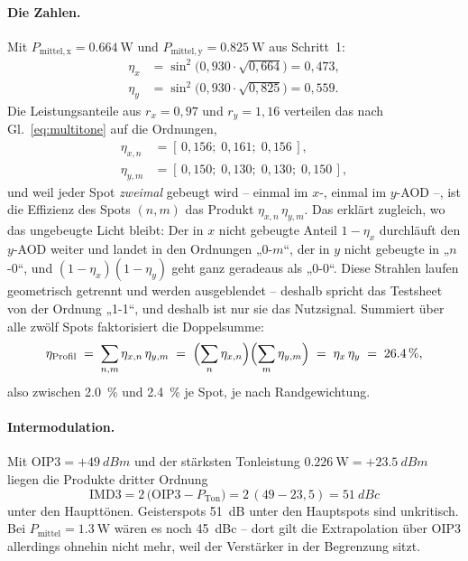 \documentclass[11pt,a4paper]{article}
\begin{document}
\paragraph{Die Zahlen.}
Mit $P_\mathrm{mittel,x}=\SI{0.664}{\watt}$ und
$P_\mathrm{mittel,y}=\SI{0.825}{\watt}$ aus Schritt~1:
\begin{align}
  \eta_x &= \sin^2\!\bigl(0{,}930\cdot\sqrt{0{,}664}\bigr) = 0{,}473 ,\\
  \eta_y &= \sin^2\!\bigl(0{,}930\cdot\sqrt{0{,}825}\bigr) = 0{,}559 .
\end{align}
Die Leistungsanteile aus $r_x=0{,}97$ und $r_y=1{,}16$ verteilen das nach
Gl.~\eqref{eq:multitone} auf die Ordnungen,
\begin{align}
  \eta_{x,n} &= [\,0{,}156;\;0{,}161;\;0{,}156\,], \\
  \eta_{y,m} &= [\,0{,}150;\;0{,}130;\;0{,}130;\;0{,}150\,],
\end{align}
und weil jeder Spot \emph{zweimal} gebeugt wird -- einmal im $x$-, einmal im
$y$-AOD --, ist die Effizienz des Spots $(n,m)$ das Produkt
$\eta_{x,n}\,\eta_{y,m}$. Das erklärt zugleich, wo das ungebeugte Licht
bleibt: Der in $x$ nicht gebeugte Anteil $1-\eta_x$ durchläuft den
$y$-AOD weiter und landet in den Ordnungen „0-$m$``, der in $y$ nicht
gebeugte in „$n$-0``, und $(1-\eta_x)(1-\eta_y)$ geht ganz geradeaus
als „0-0``. Diese Strahlen laufen geometrisch getrennt und werden
ausgeblendet -- deshalb spricht das Testsheet von der Ordnung „1-1``, und
deshalb ist nur sie das Nutzsignal. Summiert über alle zwölf Spots faktorisiert die
Doppelsumme:
\begin{equation}
  \eta_\mathrm{Profil} \;=\; \sum_{n,m}\eta_{x,n}\,\eta_{y,m}
  \;=\; \Bigl(\sum_n \eta_{x,n}\Bigr)\Bigl(\sum_m \eta_{y,m}\Bigr)
  \;=\; \eta_x\,\eta_y \;=\; \SI{26.4}{\percent},
\end{equation}
also zwischen \SI{2.0}{\percent} und \SI{2.4}{\percent} je Spot, je nach
Randgewichtung.

\paragraph{Intermodulation.}
Mit $\mathrm{OIP3}=+\SI{49}{dBm}$ und der stärksten Tonleistung
$\SI{0.226}{\watt} = +\SI{23.5}{dBm}$ liegen die Produkte dritter Ordnung
\begin{equation}
  \mathrm{IMD3} = 2\,\bigl(\mathrm{OIP3} - P_\mathrm{Ton}\bigr)
  = 2\,(49 - 23{,}5) = \SI{51}{dBc}
\end{equation}
unter den Haupttönen. Geisterspots \SI{51}{\deci\bel} unter den Hauptspots
sind unkritisch. Bei $P_\mathrm{mittel}=\SI{1.3}{\watt}$ wären es noch
\SI{45}{dBc} -- dort gilt die Extrapolation über OIP3 allerdings ohnehin nicht
mehr, weil der Verstärker in der Begrenzung sitzt.
\end{document}
